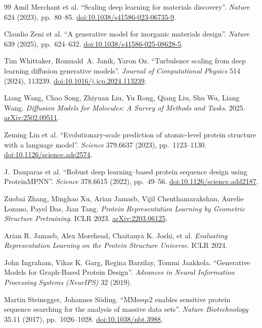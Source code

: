 \documentclass[12pt,a4paper,twoside]{report}
\begin{document}
\begin{thebibliography}{99}
Amil Merchant et al.
``Scaling deep learning for materials discovery''.
\textit{Nature} 624 (2023), pp.~80--85.
\href{https://doi.org/10.1038/s41586-023-06735-9}{doi:10.1038/s41586-023-06735-9}.

Claudio Zeni et al.
``A generative model for inorganic materials design''.
\textit{Nature} 639 (2025), pp.~624--632.
\href{https://doi.org/10.1038/s41586-025-08628-5}{doi:10.1038/s41586-025-08628-5}.

Tim Whittaker, Romuald~A. Janik, Yaron Oz.
``Turbulence scaling from deep learning diffusion generative models''.
\textit{Journal of Computational Physics} 514 (2024), 113239.
\href{https://doi.org/10.1016/j.jcp.2024.113239}{doi:10.1016/j.jcp.2024.113239}.


Liang Wang, Chao Song, Zhiyuan Liu, Yu Rong, Qiang Liu, Shu Wu, Liang Wang.
\textit{Diffusion Models for Molecules: A Survey of Methods and Tasks}. 2025.
\href{https://arxiv.org/abs/2502.09511}{arXiv:2502.09511}.


Zeming Lin et al.
``Evolutionary-scale prediction of atomic-level protein structure with a language model''.
\textit{Science} 379.6637 (2023), pp.~1123--1130.
\href{https://doi.org/10.1126/science.ade2574}{doi:10.1126/science.ade2574}.

J.~Dauparas et al.
``Robust deep learning--based protein sequence design using ProteinMPNN''.
\textit{Science} 378.6615 (2022), pp.~49--56.
\href{https://doi.org/10.1126/science.add2187}{doi:10.1126/science.add2187}.

Zuobai Zhang, Minghao Xu, Arian Jamasb, Vijil Chenthamarakshan, Aurelie Lozano, Payel Das, Jian Tang.
\textit{Protein Representation Learning by Geometric Structure Pretraining}. ICLR 2023.
\href{https://arxiv.org/abs/2203.06125}{arXiv:2203.06125}.

Arian R. Jamasb, Alex Morehead, Chaitanya K. Joshi, et al.
\textit{Evaluating Representation Learning on the Protein Structure Universe}. ICLR 2024.

John Ingraham, Vikas K. Garg, Regina Barzilay, Tommi Jaakkola.
``Generative Models for Graph-Based Protein Design''.
\textit{Advances in Neural Information Processing Systems (NeurIPS)} 32 (2019).

Martin Steinegger, Johannes S\"oding.
``MMseqs2 enables sensitive protein sequence searching for the analysis of massive data sets''.
\textit{Nature Biotechnology} 35.11 (2017), pp.~1026--1028.
\href{https://doi.org/10.1038/nbt.3988}{doi:10.1038/nbt.3988}.


\end{thebibliography}
\end{document}
